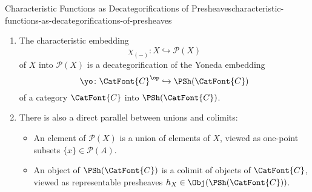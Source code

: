 \begin{remark}{Characteristic Functions as Decategorifications of Presheaves}{characteristic-functions-as-decategorifications-of-presheaves}
\begin{enumerate}
            \[%
                \chi_{X}(-_{1},-_{2})%
                \colon%
                X\times X%
                \to%
                \TTV%
            \]%
            of $X$ is a decategorification of the $\Hom$ profunctor
            \[
                \Hom_{\CatFont{C}}(-_{1},-_{2})%
                \colon%
                \CatFont{C}^{\op}\times\CatFont{C}%
                \to%
                \Sets%
            \]%
            of a category $\CatFont{C}$.
        \item\label{characteristic-functions-as-decategorifications-of-presheaves-characteristic-embedding}The characteristic embedding%
            \[
                \chi_{(-)}%
                \colon%
                X%
                \hookrightarrow%
                \mathcal{P}(X)%
            \]%
            of $X$ into $\mathcal{P}(X)$ is a decategorification of the Yoneda embedding
            \[
                \yo%
                \colon%
                \CatFont{C}^{\op}
                \hookrightarrow
                \PSh(\CatFont{C})
            \]%
            of a category $\CatFont{C}$ into $\PSh(\CatFont{C})$.
        \item\label{characteristic-functions-as-decategorifications-of-presheaves-unions-and-colimits}There is also a direct parallel between unions and colimits:
            \begin{itemize}
                \item An element of $\mathcal{P}(X)$    is a union   of elements of $X$,          viewed as one-point     subsets    $\{x\}\in\mathcal{P}(A)$.
                \item An object  of $\PSh(\CatFont{C})$ is a colimit of objects of $\CatFont{C}$, viewed as representable presheaves $h_{X}\in\Obj(\PSh(\CatFont{C}))$.
            \end{itemize}
    \end{enumerate}
\end{remark}
